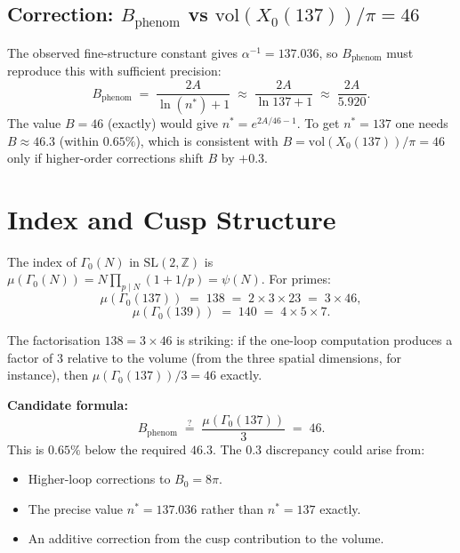 \documentclass[12pt,a4paper]{article}
\theoremstyle{definition}
\theoremstyle{remark}
\begin{document}
\subsection{Correction: $B_{\mathrm{phenom}}$ vs $\mathrm{vol}(X_0(137))/\pi = 46$}

The observed fine-structure constant gives $\alpha^{-1} = 137.036$, so
$B_{\mathrm{phenom}}$ must reproduce this with sufficient precision:
\begin{equation}
  B_{\mathrm{phenom}}
  \;=\; \frac{2A}{\ln(n^*) + 1}
  \;\approx\; \frac{2A}{\ln 137 + 1}
  \;\approx\; \frac{2A}{5.920}.
\end{equation}
The value $B = 46$ (exactly) would give $n^* = e^{2A/46 - 1}$.  To get $n^* = 137$
one needs $B \approx 46.3$ (within $0.65\%$), which is consistent with
$B = \mathrm{vol}(X_0(137))/\pi = 46$ only if higher-order corrections shift $B$
by $+0.3$.

\section{Index and Cusp Structure}
\label{sec:index_cusps}

The index of $\Gamma_0(N)$ in $\mathrm{SL}(2,\mathbb{Z})$ is
$\mu(\Gamma_0(N)) = N\prod_{p\mid N}(1 + 1/p) = \psi(N)$.  For primes:
\begin{equation}
  \mu(\Gamma_0(137)) \;=\; 138 \;=\; 2 \times 3 \times 23
  \;=\; 3 \times 46,
\end{equation}
\begin{equation}
  \mu(\Gamma_0(139)) \;=\; 140 \;=\; 4 \times 5 \times 7.
\end{equation}

The factorisation $138 = 3 \times 46$ is striking: if the one-loop computation
produces a factor of $3$ relative to the volume (from the three spatial
dimensions, for instance), then $\mu(\Gamma_0(137))/3 = 46$ exactly.

\begin{gapbox}
\textbf{Candidate formula:}
\[
  B_{\mathrm{phenom}} \;\stackrel{?}{=}\;
  \frac{\mu(\Gamma_0(137))}{3} \;=\; 46 .
\]
This is $0.65\%$ below the required $46.3$.  The $0.3$ discrepancy could arise
from:
\begin{itemize}
  \item Higher-loop corrections to $B_0 = 8\pi$.
  \item The precise value $n^* = 137.036$ rather than $n^* = 137$ exactly.
  \item An additive correction from the cusp contribution to the volume.
\end{itemize}
\end{gapbox}
\end{document}
